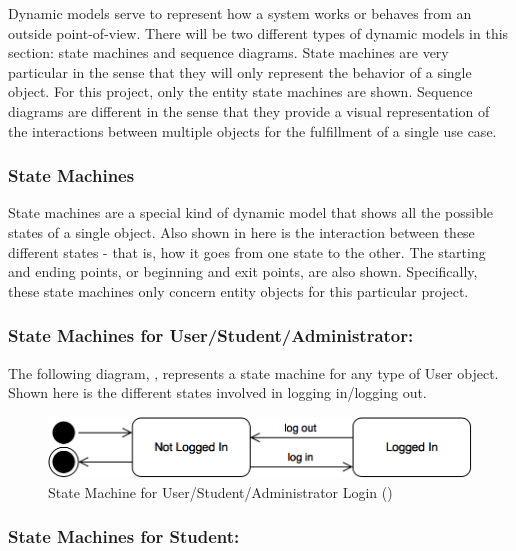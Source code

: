 \documentclass[12pt,letterpaper]{article}
\begin{document}
Dynamic models serve to represent how a system works or behaves from an outside point-of-view. There will be two different types of dynamic
models in this section: state machines and sequence diagrams. State machines are very particular in the sense that they will only represent the 
behavior of a single object. For this project, only the entity state machines are shown. Sequence diagrams are different in the sense that they
provide a visual representation of the interactions between multiple objects for the fulfillment of a single use case.

\subsubsection*{State Machines}

State machines are a special kind of dynamic model that shows all the possible states of a single object. Also shown in here is the interaction between these 
different states - that is, how it goes from one state to the other. The starting and ending points, or beginning and exit points, are also shown. Specifically, these state
machines only concern entity objects for this particular project.

\subsubsection*{State Machines for User/Student/Administrator:}

The following diagram, , represents a state machine for any type of User object. Shown here is the different states involved in logging in/logging out.

\begin{figure}[H]
	\centering{}
	\includegraphics[scale=0.3]{imgs/state/user-log-in.png}
	\caption[ - State Machine for User/Student/Administrator Login]{State Machine for User/Student/Administrator Login ()}
\end{figure}

\subsubsection*{State Machines for Student:}
\end{document}
